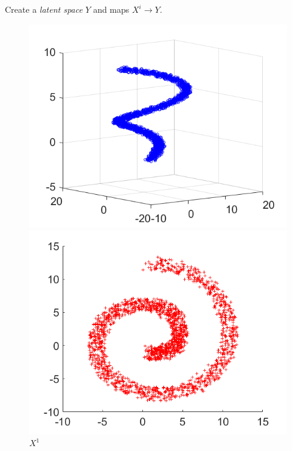 \documentclass{beamer}
\begin{document}
\begin{frame}
  Create a \emph{latent space} $Y$ and maps $X^i\to Y$.
  \begin{figure}
    \hfill
    \begin{minipage}[b]{0.32\linewidth}
      \centering
      \includegraphics[width=\textwidth]{./Images/KEMA_Example/X1.png}
      \caption{$X^1$}
    \end{minipage}
    \hfill
    \begin{minipage}[b]{0.32\linewidth}
      \centering
      \includegraphics[width=\textwidth]{./Images/KEMA_Example/X2.png}

\end{minipage}
\end{figure}
\end{frame}
\end{document}
